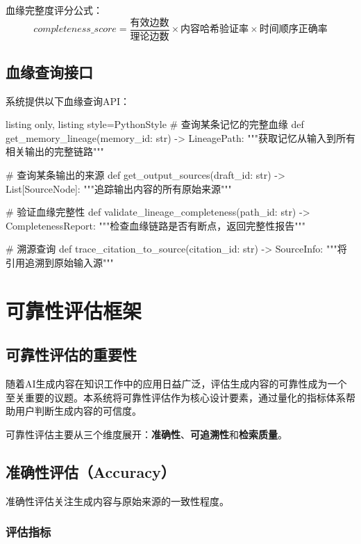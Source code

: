 \documentclass[12pt,a4paper,oneside]{article}
\begin{document}
血缘完整度评分公式：
$$completeness\_score = \frac{有效边数}{理论边数} \times 内容哈希验证率 \times 时间顺序正确率$$

\subsection{血缘查询接口}

系统提供以下血缘查询API：

\begin{tcblisting}{listing only, listing style=PythonStyle}
# 查询某条记忆的完整血缘
def get_memory_lineage(memory_id: str) -> LineagePath:
    """获取记忆从输入到所有相关输出的完整链路"""

# 查询某条输出的来源
def get_output_sources(draft_id: str) -> List[SourceNode]:
    """追踪输出内容的所有原始来源"""

# 验证血缘完整性
def validate_lineage_completeness(path_id: str) -> CompletenessReport:
    """检查血缘链路是否有断点，返回完整性报告"""

# 溯源查询
def trace_citation_to_source(citation_id: str) -> SourceInfo:
    """将引用追溯到原始输入源"""
\end{tcblisting}

\newpage

\section{可靠性评估框架}

\subsection{可靠性评估的重要性}

随着AI生成内容在知识工作中的应用日益广泛，评估生成内容的可靠性成为一个至关重要的议题。本系统将可靠性评估作为核心设计要素，通过量化的指标体系帮助用户判断生成内容的可信度。

可靠性评估主要从三个维度展开：\textbf{准确性}、\textbf{可追溯性}和\textbf{检索质量}。

\subsection{准确性评估（Accuracy）}

准确性评估关注生成内容与原始来源的一致性程度。

\subsubsection{评估指标}
\end{document}
